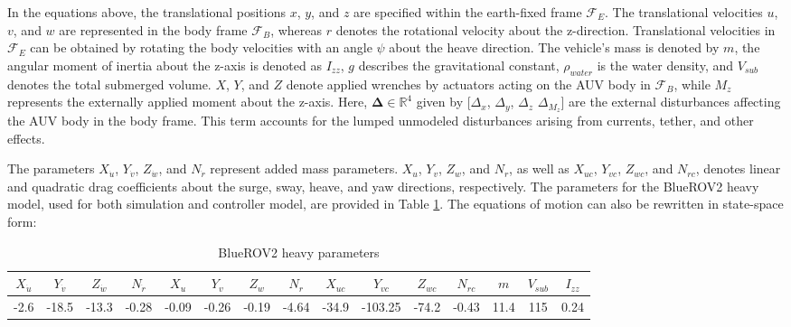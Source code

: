 In the equations above, the translational positions $x$, $y$, and $z$ are specified within the earth-fixed frame $\mathcal{F}_E$. The translational velocities $u$, $v$, and $w$ are represented in the body frame $\mathcal{F}_B$, whereas $r$ denotes the rotational velocity about the z-direction. Translational velocities in $\mathcal{F}_E$ can be obtained by rotating the body velocities with an angle $\psi$ about the heave direction. The vehicle's mass is denoted by $m$, the angular moment of inertia about the z-axis is denoted as $I_{zz}$, $g$ describes the gravitational constant, $\rho_{water}$ is the water density, and $V_{sub}$ denotes the total submerged volume. $X$, $Y$, and $Z$ denote applied wrenches by actuators acting on the \ac{AUV} body in $\mathcal{F}_B$, while $M_z$ represents the externally applied moment about the z-axis. Here, $\mathbf{\Delta}  \in \mathbb{R}^{4}$ given by [$\Delta_{x}$, $\Delta_{y}$, $\Delta_{z}$ $\Delta_{M_z}$] are the external disturbances affecting the \ac{AUV} body in the body frame. This term accounts for the lumped unmodeled disturbances arising from currents, tether, and other effects.


The parameters $X_{\dot{u}}$, $Y_{\dot{v}}$, $Z_{\dot{w}}$, and $N_{\dot{r}}$ represent added mass parameters. $X_{u}$, $Y_{v}$, $Z_{w}$, and $N_{r}$, as well as $X_{uc}$, $Y_{vc}$, $Z_{wc}$, and $N_{rc}$, denotes linear and quadratic drag coefficients about the surge, sway, heave, and yaw directions, respectively. The parameters for the BlueROV2 heavy model, used for both simulation and controller model, are provided in Table \ref{tab:brovparams}. The equations of motion can also be rewritten in state-space form:



\begin{table}[t]
\caption{BlueROV2 heavy parameters}
\centering
\scriptsize %
\setlength{\tabcolsep}{2pt} %
\renewcommand{\arraystretch}{1.2} %

\begin{tabular}{|c|c|c|c|c|c|c|c|c|c|c|c|c|c|c|}
\hline
$X_{\dot{u}}$ & $Y_{\dot{v}}$ & $Z_{\dot{w}}$ & $N_{\dot{r}}$ & 
$X_{u}$ & $Y_{v}$ & $Z_{w}$ & $N_{r}$ & $X_{uc}$ & $Y_{vc}$ & $Z_{wc}$ & $N_{rc}$ & $m$ & $V_{sub}$ & $I_{zz}$ \\ \hline
-2.6 & -18.5 & -13.3 & -0.28 & 
-0.09 & -0.26 & -0.19 & -4.64 & -34.9 & -103.25 & -74.2 & -0.43 & 11.4 & 115 & 0.24 \\ \hline
\end{tabular}

\label{tab:brovparams}
\vspace{-0.3cm}
\end{table}






